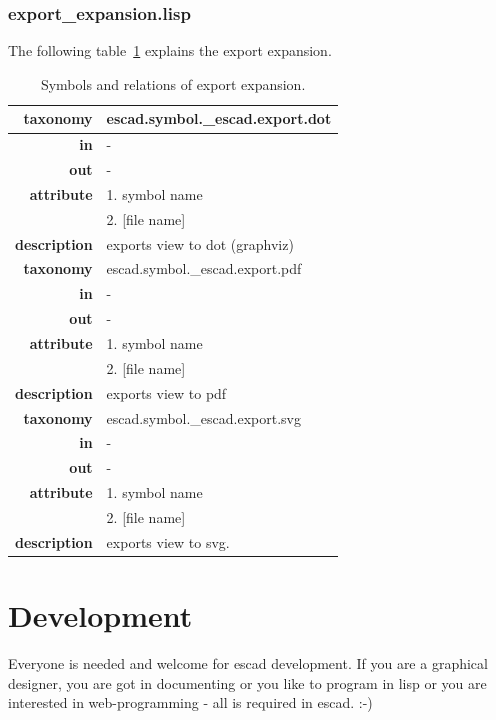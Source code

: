 \documentclass[a4paper, 12pt, openany]{scrbook}
\begin{document}
\subsection{export\_expansion.lisp}
The following table~\ref{tab:exp-export-expansion} explains the export expansion.
\newcommand{\tabitem}{~~\llap{\textbullet}~~}
\begin{table}[htbp]
\centering
\begin{tabular}{r|p{11cm}}
  \textbf{taxonomy} & \colorbox{black!20}{escad.symbol.\_escad.export.dot} \\
  \hline
  \textbf{in} & - \\
  \hline
  \textbf{out} & - \\
  \hline
  \textbf{attribute} & 1. symbol name \\
                     & 2. [file name] \\
  \hline
  \textbf{description} & exports view to dot (graphviz) \\
  \hline
  \hline
  \textbf{taxonomy} & \colorbox{black!20}{escad.symbol.\_escad.export.pdf} \\
  \hline
  \textbf{in} & - \\
  \hline
  \textbf{out} & - \\
  \hline
  \textbf{attribute} & 1. symbol name \\
                     & 2. [file name] \\
  \hline
  \textbf{description} & exports view to pdf \\
  \hline
  \hline
  \textbf{taxonomy} & \colorbox{black!20}{escad.symbol.\_escad.export.svg} \\
  \hline
  \textbf{in} & - \\
  \hline
  \textbf{out} & - \\
  \hline
  \textbf{attribute} & 1. symbol name \\
                     & 2. [file name] \\
  \hline
  \textbf{description} & exports view to svg. \\
\end{tabular}
\caption{Symbols and relations of export expansion.}
\label{tab:exp-export-expansion}
\end{table}
\chapter{Development}
Everyone is needed and welcome for escad development. If you are a graphical designer, you are got in documenting or you like to program in lisp or you are interested in web-programming - all is required in escad. :-)
\end{document}
